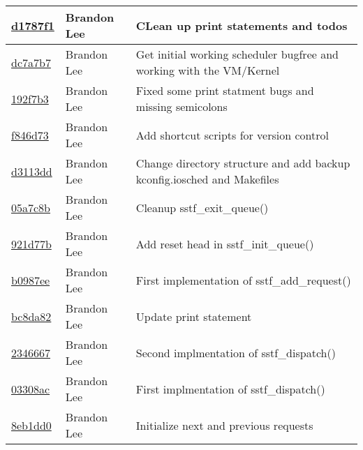 \documentclass[letterpaper,10pt,titlepage]{article}
\begin{document}
\begin{tabular}{l l l}
\href{https://github.com/brandonlee503/Operating-Systems-II/commit/d1787f12cc18301b0d264e55c117847cfbc1ddc4}{d1787f1} & Brandon Lee & CLean up print statements and todos\\\hline
\href{https://github.com/brandonlee503/Operating-Systems-II/commit/dc7a7b740312eeaff8f426bac4ea7b7e4dceb005}{dc7a7b7} & Brandon Lee & Get initial working scheduler bugfree and working with the VM/Kernel\\\hline
\href{https://github.com/brandonlee503/Operating-Systems-II/commit/192f7b3ece63a2b4059166cd1ad9455f5ca69a6d}{192f7b3} & Brandon Lee & Fixed some print statment bugs and missing semicolons\\\hline
\href{https://github.com/brandonlee503/Operating-Systems-II/commit/f846d738bc81c25666c8b2815ae603b9f8b34e66}{f846d73} & Brandon Lee & Add shortcut scripts for version control\\\hline
\href{https://github.com/brandonlee503/Operating-Systems-II/commit/d3113dd71f3b5073bc5ccfd5b9aaa08d55e0fb02}{d3113dd} & Brandon Lee & Change directory structure and add backup kconfig.iosched and Makefiles\\\hline
\href{https://github.com/brandonlee503/Operating-Systems-II/commit/05a7c8b6e4955f503678b0fb6bdec4922502f11c}{05a7c8b} & Brandon Lee & Cleanup sstf_exit_queue()\\\hline
\href{https://github.com/brandonlee503/Operating-Systems-II/commit/921d77bf114c91431870624ee635a9965ff74dbb}{921d77b} & Brandon Lee & Add reset head in sstf_init_queue()\\\hline
\href{https://github.com/brandonlee503/Operating-Systems-II/commit/b0987ee71ac38c5ed9d9885761c4d1d917a525e7}{b0987ee} & Brandon Lee & First implementation of sstf_add_request()\\\hline
\href{https://github.com/brandonlee503/Operating-Systems-II/commit/bc8da82910c721486bf1f3edfe3a388f58f48812}{bc8da82} & Brandon Lee & Update print statement\\\hline
\href{https://github.com/brandonlee503/Operating-Systems-II/commit/2346667f4d13de671a53501db64a0dd2d009d7e3}{2346667} & Brandon Lee & Second implmentation of sstf_dispatch()\\\hline
\href{https://github.com/brandonlee503/Operating-Systems-II/commit/03308acb7ed33005695d9b27169005beafcf02db}{03308ac} & Brandon Lee & First implmentation of sstf_dispatch()\\\hline
\href{https://github.com/brandonlee503/Operating-Systems-II/commit/8eb1dd0e8e9d6064272f27dd5bf52af634b6c348}{8eb1dd0} & Brandon Lee & Initialize next and previous requests\\\hline

\end{tabular}
\end{document}
